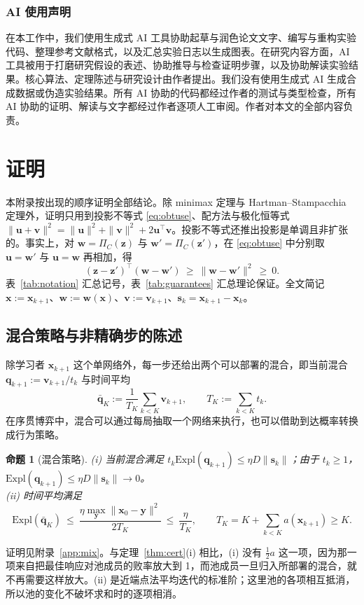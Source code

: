 \documentclass{article}
\theoremstyle{plain}
\newtheorem{proposition}[theorem]{命题}
\theoremstyle{remark}
\newcommand{\Expl}{\mathrm{Expl}}
\newcommand{\Proj}{\Pi}
\newcommand{\bx}{{\bm{x}}}
\newcommand{\by}{{\bm{y}}}
\newcommand{\bv}{{\bm{v}}}
\newcommand{\bw}{{\bm{w}}}
\newcommand{\bz}{{\bm{z}}}
\newcommand{\bu}{{\bm{u}}}
\newcommand{\bq}{{\bm{q}}}
\newcommand{\dx}{{\bm{s}}}
\begin{document}
\subsubsection*{AI 使用声明}
在本工作中，我们使用生成式 AI 工具协助起草与润色论文文字、编写与重构实验代码、整理参考文献格式，以及汇总实验日志以生成图表。在研究内容方面，AI 工具被用于打磨研究假设的表述、协助推导与检查证明步骤，以及协助解读实验结果。核心算法、定理陈述与研究设计由作者提出。我们没有使用生成式 AI 生成合成数据或伪造实验结果。所有 AI 协助的代码都经过作者的测试与类型检查，所有 AI 协助的证明、解读与文字都经过作者逐项人工审阅。作者对本文的全部内容负责。




\appendix
\section{证明}
\label{app:proofs}

本附录按出现的顺序证明全部结论。除 minimax 定理与 Hartman--Stampacchia 定理外，证明只用到投影不等式 \eqref{eq:obtuse}、配方法与极化恒等式 $\|\bu+\bv\|^2=\|\bu\|^2+\|\bv\|^2+2\bu^\top\bv$。投影不等式还推出投影是单调且非扩张的\citep{bauschke2011convex}。事实上，对 $\bw=\Proj_C(\bz)$ 与 $\bw'=\Proj_C(\bz')$，在 \eqref{eq:obtuse} 中分别取 $\bu=\bw'$ 与 $\bu=\bw$ 再相加，得
\begin{equation}
(\bz-\bz')^\top(\bw-\bw')\ \ge\ \|\bw-\bw'\|^2\ \ge\ 0 .
\label{eq:monotone}
\end{equation}
表~\ref{tab:notation} 汇总记号，表~\ref{tab:guarantees} 汇总理论保证。全文简记 $\bx:=\bx_{k+1}$、$\bw:=\bw(\bx)$、$\bv:=\bv_{k+1}$、$\dx_k=\bx_{k+1}-\bx_k$。

\subsection{混合策略与非精确步的陈述}
\label{app:inexact-statements}

除学习者 $\bx_{k+1}$ 这个单网络外，每一步还给出两个可以部署的混合，即当前混合 $\bq_{k+1}:=\bv_{k+1}/t_k$ 与时间平均
\[
\bar{\bq}_K:=\frac1{T_K}\sum_{k<K}\bv_{k+1},\qquad T_K:=\sum_{k<K}t_k .
\]
在序贯博弈中，混合可以通过每局抽取一个网络来执行，也可以借助到达概率转换成行为策略\citep{kuhn1953}。
\begin{proposition}[混合策略]
\label{prop:mix}
(i) 当前混合满足 $t_k\Expl(\bq_{k+1})\le\eta D\|\dx_k\|$；由于 $t_k\ge1$，$\Expl(\bq_{k+1})\le\eta D\|\dx_k\|\to0$。\\
(ii) 时间平均满足
\[
\Expl(\bar{\bq}_K)\ \le\ \frac{\eta\max_\by\|\bx_0-\by\|^2}{2T_K}\ \le\ \frac{\eta}{T_K},\qquad T_K=K+\textstyle\sum_{k<K}a(\bx_{k+1})\ge K.
\]
\end{proposition}
证明见附录~\ref{app:mix}。与定理~\ref{thm:cert}(i) 相比，(i) 没有 $\tfrac12a$ 这一项，因为那一项来自把最佳响应对池成员的败率放大到 1，而池成员一旦归入所部署的混合，就不再需要这样放大。(ii) 是近端点法平均迭代的标准阶\citep{rockafellar1976ppa,nemirovski2004prox}；这里池的各项相互抵消，所以池的变化不破坏求和时的逐项相消。
\end{document}
